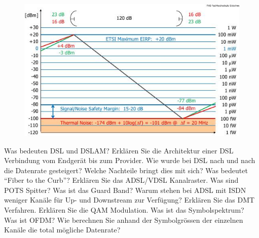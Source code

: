 \documentclass[ngerman,a4paper,12pt]{scrreprt}
\begin{document}
		\begin{figure}[H]
		\centering
		\includegraphics[width=\textwidth]{img/R6.1.jpg}
		\caption{}
		\label{pegelplan}
	\end{figure}
\olS


\olR
	\li Was bedeuten DSL und DSLAM?
	\li Erklären Sie die Architektur einer DSL Verbindung vom Endgerät bis zum Provider.
	\li Wie wurde bei DSL nach und nach die Datenrate gesteigert? Welche Nachteile bringt dies mit sich?
	\li Was bedeutet ``Fiber to the Curb''?
	\li Erklären Sie das ADSL/VDSL Kanalraster.
	\li Was sind POTS Spitter? Was ist das Guard Band?
	\li Warum stehen bei ADSL mit ISDN weniger Kanäle für Up- und Downstream zur Verfügung?
	\li Erklären Sie das DMT Verfahren.
	\li Erklären Sie die QAM Modulation.
	\li Was ist das Symbolspektrum? Was ist OFDM?
	\li Wie berechnen Sie anhand der Symbolgrössen der einzelnen Kanäle die total mögliche Datenrate?
\olS
\end{document}
